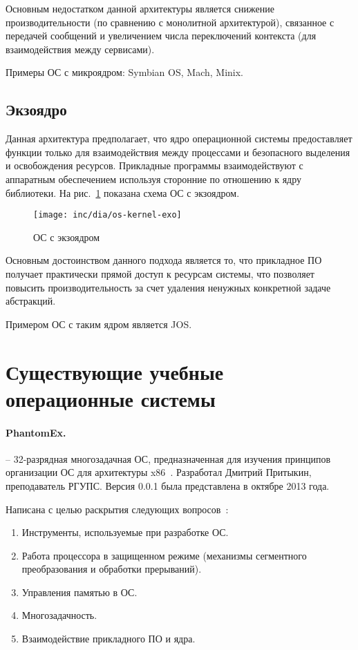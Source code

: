 Основным недостатком данной архитектуры является снижение производительности
(по сравнению с монолитной архитектурой), связанное с передачей сообщений и
увеличением числа переключений контекста (для взаимодействия между сервисами).

Примеры ОС с микроядром: Symbian OS, Mach, Minix.

\subsection{Экзоядро}
Данная архитектура предполагает, что ядро операционной системы предоставляет
функции только для взаимодействия между процессами и безопасного выделения и
освобождения ресурсов. Прикладные программы взаимодействуют с аппаратным
обеспечением используя сторонние по отношению к ядру библиотеки.
На рис.~\ref{fig:os-kernel-exo} показана схема ОС с экзоядром.

\begin{figure}[ht!]
  \centering
  \texttt{[image: inc/dia/os-kernel-exo]}
  \caption{ОС с экзоядром}
  \label{fig:os-kernel-exo}
\end{figure}

Основным достоинством данного подхода является то, что прикладное ПО получает
практически прямой доступ к ресурсам системы, что позволяет повысить производительность
за счет удаления ненужных конкретной задаче абстракций.

Примером ОС с таким ядром является JOS.

\section{Существующие учебные операционные системы}
\paragraph{PhantomEx.} -- 32-разрядная многозадачная ОС, предназначенная для изучения
принципов организации ОС для архитектуры x86~\cite{phantomex}. Разработал Дмитрий Притыкин,
преподаватель РГУПС. Версия 0.0.1 была представлена в октябре 2013 года.

Написана с целью раскрытия следующих вопросов~\cite{os_dev}:
\begin{enumerate}[1.]
\item Инструменты, используемые при разработке ОС.
\item Работа процессора в защищенном режиме (механизмы сегментного преобразования
	и обработки прерываний).
\item Управления памятью в ОС.
\item Многозадачность.
\item Взаимодействие прикладного ПО и ядра.
\end{enumerate}

